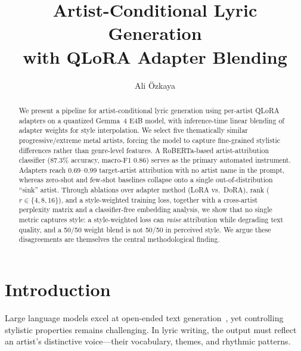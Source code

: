 \documentclass[runningheads]{llncs}
\begin{document}
\title{Artist-Conditional Lyric Generation\\with QLoRA Adapter Blending}

\author{Ali \"Ozkaya}

\maketitle

\begin{abstract}
We present a pipeline for artist-conditional lyric generation using per-artist QLoRA adapters on a quantized Gemma~4 E4B model, with inference-time linear blending of adapter weights for style interpolation. We select five thematically similar progressive/extreme metal artists, forcing the model to capture fine-grained stylistic differences rather than genre-level features. A RoBERTa-based artist-attribution classifier (87.3\% accuracy, macro-F1 0.86) serves as the primary automated instrument. Adapters reach 0.69--0.99 target-artist attribution with no artist name in the prompt, whereas zero-shot and few-shot baselines collapse onto a single out-of-distribution ``sink'' artist. Through ablations over adapter method (LoRA vs.\ DoRA), rank ($r\in\{4,8,16\}$), and a style-weighted training loss, together with a cross-artist perplexity matrix and a classifier-free embedding analysis, we show that no single metric captures style: a style-weighted loss can \emph{raise} attribution while degrading text quality, and a 50/50 weight blend is not 50/50 in perceived style. We argue these disagreements are themselves the central methodological finding.
\end{abstract}


\section{Introduction}
\label{sec:intro}

Large language models excel at open-ended text generation~\cite{radford2019language}, yet controlling stylistic properties remains challenging. In lyric writing, the output must reflect an artist's distinctive voice---their vocabulary, themes, and rhythmic patterns.
\end{document}

